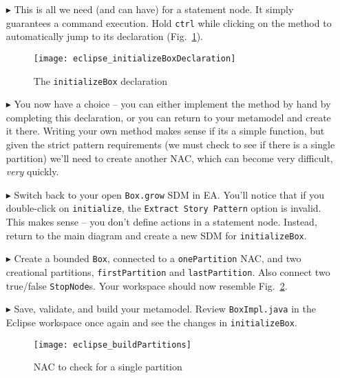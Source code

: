 \begin{itemize}
\item[$\blacktriangleright$] This is all we need (and can have) for a statement node. It simply guarantees a command execution. Hold \texttt{ctrl} while
clicking on the method to automatically jump to its declaration (Fig.~\ref{fig:initBoxDecl}).

\begin{figure}[htp]
\begin{center}
  \texttt{[image: eclipse\_initializeBoxDeclaration]}
  \caption{The \texttt{initializeBox} declaration}
  \label{fig:initBoxDecl}
\end{center}
\end{figure}

\item[$\blacktriangleright$] You now have a choice -- you can either implement the method by hand by completing this declaration, or you can return to
your metamodel and create it there. Writing your own method makes sense if its a simple function, but given the strict pattern requirements (we must check
to see if there is a single partition) we'll need to create another NAC, which can become very difficult, \emph{very} quickly.

 \item[$\blacktriangleright$] Switch back to your open \texttt{Box.grow} SDM in EA. You'll notice that if you double-click on \texttt{initialize}, the
 \texttt{Extract Story Pattern} option is invalid. This makes sense -- you don't define actions in a statement node. Instead, return to the main diagram and
 create a new SDM for \texttt{initializeBox}.
 
 \item[$\blacktriangleright$] Create a bounded \texttt{Box}, connected to a \texttt{onePartition} NAC, and two creational partitions, \texttt{firstPartition}
 and \texttt{lastPartition}. Also connect two true/false \texttt{StopNode}s. Your workspace should now resemble Fig.~\ref{fig:buildPartitions}.
 
\item[$\blacktriangleright$] Save, validate, and build your metamodel. Review \texttt{BoxImpl.java} in the Eclipse workspace once again and see the changes in
\texttt{initializeBox}.
 
\newpage
 
 \vspace*{3cm}
 
 \begin{figure}[htp]
\begin{center}
  \texttt{[image: eclipse\_buildPartitions]}
  \caption{NAC to check for a single partition}
  \label{fig:buildPartitions}
\end{center}
\end{figure}


\end{itemize}
